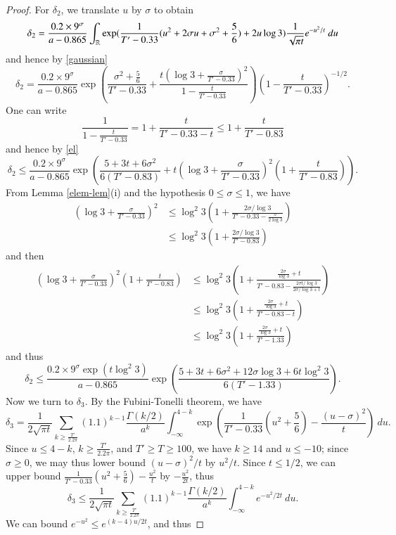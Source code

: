 \begin{proof}
For $\delta_2$, we translate $u$ by $\sigma$ to obtain
$$ \delta_2 = \frac{0.2 \times 9^\sigma}{a-0.865} \int_{\mathbb{R}} \exp( \frac{1}{T'-0.33} (u^2 + 2 \sigma u + \sigma^2 + \frac{5}{6}) + 2 u \log 3 ) \frac{1}{\sqrt{\pi t}} e^{-u^2/t}\ du$$
and hence by \eqref{gaussian}
$$ \delta_2 = \frac{0.2 \times 9^\sigma}{a-0.865} \exp( \frac{\sigma^2 + \frac{5}{6}}{T'-0.33} + \frac{t(\log 3 + \frac{\sigma}{T'-0.33})^2}{1 - \frac{t}{T'-0.33}} ) (1 - \frac{t}{T'-0.33})^{-1/2}.$$
One can write
$$ \frac{1}{1 - \frac{t}{T'-0.33}} = 1 + \frac{t}{T'-0.33-t} \leq 1 + \frac{t}{T'-0.83}$$
and hence by \eqref{el}
$$ \delta_2 \leq \frac{0.2 \times 9^\sigma}{a-0.865} \exp( \frac{5+3t+6\sigma^2}{6(T'-0.83)} + t(\log 3 + \frac{\sigma}{T'-0.33})^2 (1 + \frac{t}{T'-0.83}) ).$$
From Lemma \ref{elem-lem}(i) and the hypothesis $0 \leq \sigma \leq 1$, we have
\begin{align*}
(\log 3 + \frac{\sigma}{T'-0.33})^2 &\leq \log^2 3 (1 + \frac{2 \sigma / \log 3}{T' - 0.33 - \frac{\sigma}{2\log 3}}) \\
&\leq  \log^2 3 (1 + \frac{2 \sigma / \log 3}{T' - 0.83})
\end{align*}
and then
\begin{align*}
(\log 3 + \frac{\sigma}{T'-0.33})^2 (1 + \frac{t}{T'-0.83}) 
&\leq \log^2 3 (1 + \frac{\frac{2 \sigma}{\log 3} + t}{T' - 0.83 - \frac{2\sigma t/\log 3}{2\sigma/\log 3 + t}}) \\
&\leq \log^2 3 (1 + \frac{\frac{2 \sigma}{\log 3} + t}{T' - 0.83 - t}) \\
&\leq \log^2 3 (1 + \frac{\frac{2 \sigma}{\log 3} + t}{T' - 1.33}) 
\end{align*}
and thus
$$ \delta_2 \leq \frac{0.2 \times 9^\sigma \exp( t \log^2 3 )}{a-0.865} \exp( \frac{5+3t+6\sigma^2 + 12 \sigma \log 3 + 6t \log^2 3}{6(T'-1.33)} ).$$
Now we turn to $\delta_3$. By the Fubini-Tonelli theorem, we have
$$ \delta_3 = \frac{1}{2 \sqrt{\pi t}} \sum_{k \geq \frac{T'}{2.2 \pi}} (1.1)^{k-1} \frac{\Gamma(k/2)}{a^k} \int_{-\infty}^{4-k} \exp( \frac{1}{T'-0.33} (u^2 + \frac{5}{6}) - \frac{(u-\sigma)^2}{t} )\ du.$$
Since $u \leq 4-k$, $k \geq \frac{T'}{2.2\pi}$, and $T' \geq T \geq 100$, we have $k \geq 14$ and $u \leq -10$; since $\sigma \geq 0$, we may thus lower bound $(u-\sigma)^2/t$ by $u^2/t$.  Since $t \leq 1/2$, we can upper bound $\frac{1}{T'-0.33} (u^2 + \frac{5}{6}) - \frac{u^2}{t}$ by $-\frac{u^2}{2t}$, thus
$$ \delta_3 \leq \frac{1}{2 \sqrt{\pi t}} \sum_{k \geq \frac{T'}{2.2 \pi}} (1.1)^{k-1} \frac{\Gamma(k/2)}{a^k} \int_{-\infty}^{4-k} e^{-u^2/2t}\ du.$$
We can bound $e^{-u^2} \leq e^{(k-4)u/2t}$, and thus

\end{proof}
